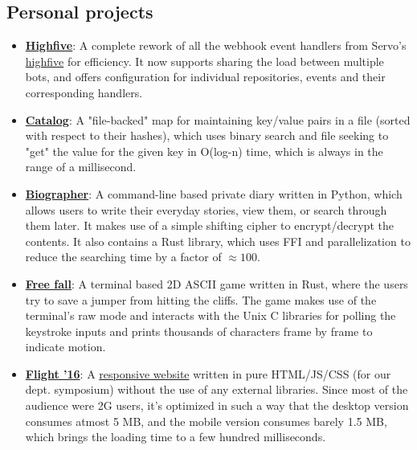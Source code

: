\documentclass[11pt,a4paper,sans]{moderncv}        %
\newcommand\chref[3][linky]{\href{#2}{\color{#1}#3}}
\begin{document}
\subsection{Personal projects}
\begin{itemize}
\item \textbf{\chref{https://github.com/servo-highfive/highfive}{Highfive}}: A complete rework of all the webhook event handlers from Servo's \chref{https://github.com/servo/highfive}{highfive} for efficiency. It now supports sharing the load between multiple bots, and offers configuration for individual repositories, events and their corresponding handlers.
\item \textbf{\chref{https://github.com/Wafflespeanut/rust-catalog}{Catalog}}: A "file-backed" map for maintaining key/value pairs in a file (sorted with respect to their hashes), which uses binary search and file seeking to "get" the value for the given key in O(log-n) time, which is always in the range of a millisecond.
\item \textbf{\chref{https://github.com/Wafflespeanut/biographer}{Biographer}}: A command-line based private diary written in Python, which allows users to write their everyday stories, view them, or search through them later. It makes use of a simple shifting cipher to encrypt/decrypt the contents. It also contains a Rust library, which uses FFI and parallelization to reduce the searching time by a factor of $\approx 100$.
\item \textbf{\chref{https://github.com/Wafflespeanut/free-fall}{Free fall}}: A terminal based 2D ASCII game written in Rust, where the users try to save a jumper from hitting the cliffs. The game makes use of the terminal's raw mode and interacts with the Unix C libraries for polling the keystroke inputs and prints thousands of characters frame by frame to indicate motion.
\item \textbf{\chref{https://github.com/Wafflespeanut/flight-2016}{Flight '16}}: A \chref{http://wafflespeanut.github.io/flight-2016}{responsive website} written in pure HTML/JS/CSS (for our dept. symposium) without the use of any external libraries. Since most of the audience were 2G users, it's optimized in such a way that the desktop version consumes atmost 5 MB, and the mobile version consumes barely 1.5 MB, which brings the loading time to a few hundred milliseconds.
\end{itemize}

\end{document}
